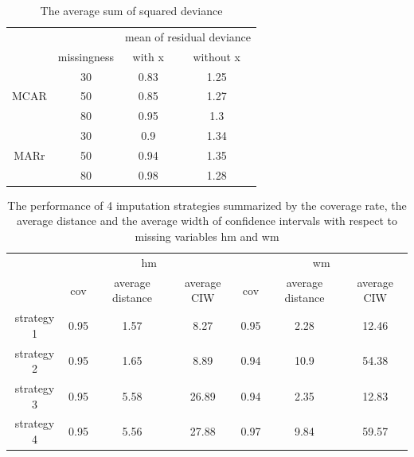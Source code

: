 \documentclass[12pt, fullpage, a4paper]{article}
\begin{document}
\begin{table}[ht!]
	\begin{tabular}{cc|cc}
		&             & \multicolumn{2}{c}{mean of residual deviance} \\ \cline{2-4} 
		\multicolumn{1}{c|}{}     & missingness & with x               & without x               \\
		\multicolumn{1}{c|}{}     & 30          & 0.83                 & 1.25                    \\
		\multicolumn{1}{c|}{MCAR} & 50          & 0.85                 & 1.27                    \\
		\multicolumn{1}{c|}{}     & 80          & 0.95                 & 1.3                     \\ \hline
		\multicolumn{1}{c|}{}     & 30          & 0.9                  & 1.34                    \\
		\multicolumn{1}{c|}{MARr} & 50          & 0.94                 & 1.35                    \\
		\multicolumn{1}{c|}{}     & 80          & 0.98                 & 1.28                   
	\end{tabular}
	\caption{The average sum of squared deviance}
	\label{tab5}
\end{table}

\begin{table}[ht!]
	\begin{tabular}{c|ccc|ccc}
		& \multicolumn{3}{c|}{hm}               & \multicolumn{3}{c}{wm}                \\ \cline{2-7} 
		& cov  & average distance & average CIW & cov  & average distance & average CIW \\
		strategy 1 & 0.95 & 1.57             & 8.27        & 0.95 & 2.28             & 12.46       \\
		strategy 2 & 0.95 & 1.65             & 8.89        & 0.94 & 10.9             & 54.38       \\
		strategy 3 & 0.95 & 5.58             & 26.89       & 0.94 & 2.35             & 12.83       \\
		strategy 4 & 0.95 & 5.56             & 27.88       & 0.97 & 9.84             & 59.57      
	\end{tabular}
	\caption{The performance of 4 imputation strategies summarized by the coverage rate, the average distance and the average width of confidence intervals with respect to missing variables hm and wm}
	\label{tab6}
\end{table}
\end{document}
